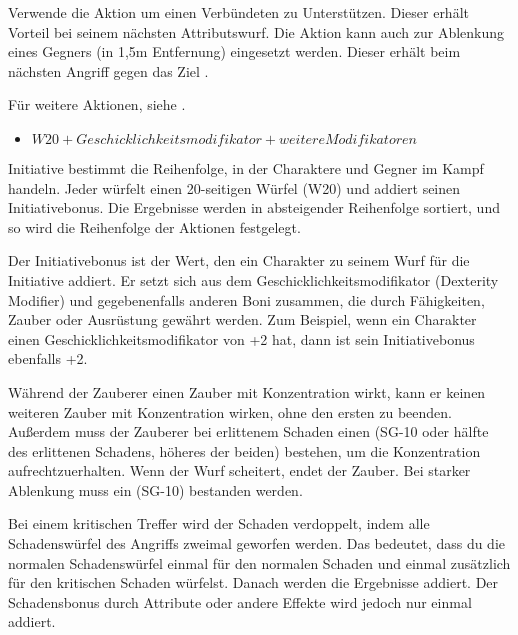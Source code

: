 Verwende die Aktion um einen Verbündeten zu Unterstützen. Dieser erhält Vorteil bei seinem nächsten Attributswurf. Die Aktion kann auch zur Ablenkung eines Gegners (in 1,5m Entfernung) eingesetzt werden. Dieser erhält beim nächsten Angriff gegen das Ziel .

Für weitere Aktionen, siehe .



\begin{itemize}
\item $W20 + Geschicklichkeitsmodifikator + weitere Modifikatoren$
\end{itemize}

Initiative bestimmt die Reihenfolge, in der Charaktere und Gegner im Kampf handeln. Jeder würfelt einen 20-seitigen Würfel (W20) und addiert seinen Initiativebonus. Die Ergebnisse werden in absteigender Reihenfolge sortiert, und so wird die Reihenfolge der Aktionen festgelegt.

Der Initiativebonus ist der Wert, den ein Charakter zu seinem Wurf für die Initiative addiert. Er setzt sich aus dem Geschicklichkeitsmodifikator (Dexterity Modifier) und gegebenenfalls anderen Boni zusammen, die durch Fähigkeiten, Zauber oder Ausrüstung gewährt werden. Zum Beispiel, wenn ein Charakter einen Geschicklichkeitsmodifikator von +2 hat, dann ist sein Initiativebonus ebenfalls +2.



Während der Zauberer einen Zauber mit Konzentration wirkt, kann er keinen weiteren Zauber mit Konzentration wirken, ohne den ersten zu beenden. Außerdem muss der Zauberer bei erlittenem Schaden einen  (SG-10 oder hälfte des erlittenen Schadens, höheres der beiden) bestehen, um die Konzentration aufrechtzuerhalten. Wenn der Wurf scheitert, endet der Zauber. Bei starker Ablenkung muss ein  (SG-10) bestanden werden.



Bei einem kritischen Treffer wird der Schaden verdoppelt, indem alle Schadenswürfel des Angriffs zweimal geworfen werden. Das bedeutet, dass du die normalen Schadenswürfel einmal für den normalen Schaden und einmal zusätzlich für den kritischen Schaden würfelst. Danach werden die Ergebnisse addiert. Der Schadensbonus durch Attribute oder andere Effekte wird jedoch nur einmal addiert.



